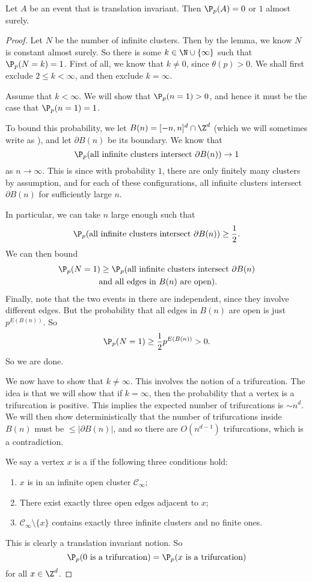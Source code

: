 \documentclass[a4paper]{article}
\begin{document}
\begin{ex}
  Let $A$ be an event that is translation invariant. Then $\P_p(A) = 0$ or $1$ almost surely. %
\end{ex}

\begin{proof}
  Let $N$ be the number of infinite clusters. Then by the lemma, we know $N$ is constant almost surely. So there is some $k \in \N \cup \{\infty\}$ such that $\P_p(N = k) = 1$. First of all, we know that $k \not= 0$, since $\theta(p) > 0$. We shall first exclude $2 \leq k < \infty$, and then exclude $k = \infty$.

  Assume that $k < \infty$. We will show that $\P_p(n = 1) > 0$, and hence it must be the case that $\P_p(n = 1) = 1$.

  To bound this probability, we let $B(n) = [-n, n]^d \cap \Z^d$ (which we will sometimes write as ), and let $\partial B(n)$ be its boundary. We know that
  \[
    \P_p(\text{all infinite clusters intersect $\partial B(n)$}) \to 1
  \]
  as $n \to \infty$. This is since with probability $1$, there are only finitely many clusters by assumption, and for each of these configurations, all infinite clusters intersect $\partial B(n)$ for sufficiently large $n$.

  In particular, we can take $n$ large enough such that
  \[
    \P_p(\text{all infinite clusters intersect }\partial B(n)) \geq \frac{1}{2}.
  \]
  We can then bound
  \begin{multline*}
    \P_p(N = 1) \geq \P_p(\text{all infinite clusters intersect }\partial B(n)\\
    \text{ and all edges in $B(n)$ are open}).
  \end{multline*}
  Finally, note that the two events in there are independent, since they involve different edges. But the probability that all edges in $B(n)$ are open is just $p^{E(B(n))}$. So
  \[
    \P_p(N = 1) \geq \frac{1}{2} p^{E(B(n))} > 0.
  \]
  So we are done.

  We now have to show that $k \not= \infty$. This involves the notion of a trifurcation. The idea is that we will show that if $k = \infty$, then the probability that a vertex is a trifurcation is positive. This implies the expected number of trifurcations is $\sim n^d$. We will then show deterministically that the number of trifurcations inside $B(n)$ must be $\leq |\partial B(n)|$, and so there are $O(n^{d - 1})$ trifurcations, which is a contradiction.

  We say a vertex $x$ is a  if the following three conditions hold:
  \begin{enumerate}
    \item $x$ is in an infinite open cluster $\mathcal{C}_\infty$;
    \item There exist exactly three open edges adjacent to $x$;
    \item $\mathcal{C}_\infty \setminus \{x\}$ contains exactly three infinite clusters and no finite ones.
  \end{enumerate}
  This is clearly a translation invariant notion. So
  \[
    \P_p(0 \text{ is a trifurcation}) = \P_p(x \text{ is a trifurcation})
  \]
  for all $x \in \Z^d$.


\end{proof}
\end{document}
